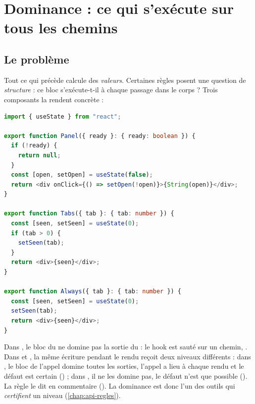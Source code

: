 \section{Dominance : ce qui s'exécute sur tous les chemins}
\label{sec:cfg-analyzer-dominance-dominance}

\subsection{Le problème}

Tout ce qui précède calcule des \emph{valeurs}. Certaines règles posent une
question de \emph{structure} : ce bloc s'exécute-t-il à chaque passage dans le
corps ? Trois composants la rendent concrète :

\begin{lstlisting}[language=TypeScript,caption={Trois questions de dominance (\file{/tmp/ch12/early.tsx})},label={lst:cfg-analyzer-dominance-early}]
import { useState } from "react";

export function Panel({ ready }: { ready: boolean }) {
  if (!ready) {
    return null;
  }
  const [open, setOpen] = useState(false);
  return <div onClick={() => setOpen(!open)}>{String(open)}</div>;
}

export function Tabs({ tab }: { tab: number }) {
  const [seen, setSeen] = useState(0);
  if (tab > 0) {
    setSeen(tab);
  }
  return <div>{seen}</div>;
}

export function Always({ tab }: { tab: number }) {
  const [seen, setSeen] = useState(0);
  setSeen(tab);
  return <div>{seen}</div>;
}
\end{lstlisting}


Dans , le bloc du  ne domine pas la sortie du
 : le hook est sauté sur un chemin, \Error{}. Dans
 et , la même écriture pendant le rendu reçoit deux
niveaux différents : dans , le bloc de l'appel domine toutes les
sorties, l'appel a lieu à chaque rendu et le défaut est certain (\Error) ;
dans , il ne les domine pas, le défaut n'est que possible
(\Warning). La règle le dit en commentaire
(). La dominance est donc
l'un des outils qui \emph{certifient} un niveau \Error{}
(\cref{chap:api-regles}).

